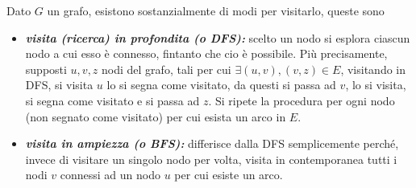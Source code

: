 \documentclass{subfiles}
\begin{document}
Dato \(G\) un grafo, esistono sostanzialmente di modi per visitarlo, queste sono
\begin{itemize}
    \item \emph{\textbf{visita (ricerca) in profondita (o DFS):}} scelto un nodo si esplora ciascun nodo a cui esso è connesso, fintanto che cio è possibile.
          Più precisamente, supposti \(u,v,z\) nodi del grafo, tali per cui \(\exists (u, v), (v, z) \in E\),
          visitando in DFS, si visita \(u\) lo si segna come visitato, da questi si passa ad \(v\), lo si visita, si segna come visitato e si passa ad \(z\).
          Si ripete la procedura per ogni nodo (non segnato come visitato) per cui esista un arco in \(E\).

    \item \emph{\textbf{visita in ampiezza (o BFS):}} differisce dalla DFS semplicemente perché, invece di visitare un singolo nodo per volta,
          visita in contemporanea tutti i nodi \(v\) connessi ad un nodo \(u\) per cui esiste un arco.
\end{itemize}
\end{document}
